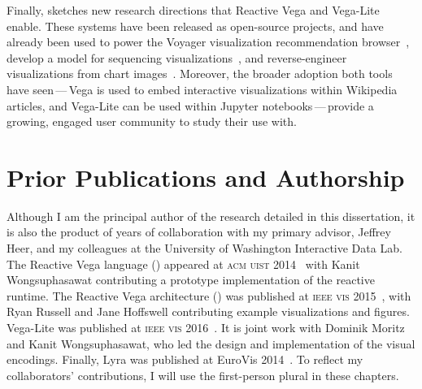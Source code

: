 Finally,  sketches new research directions that Reactive
Vega and Vega-Lite enable. These systems have been released as open-source
projects, and have already been used to power the Voyager visualization
recommendation browser~\cite{voyager,voyager2,compassql}, develop a model for
sequencing visualizations~\cite{kim:graphscape}, and reverse-engineer
visualizations from chart images~\cite{poco:reverse}. Moreover, the broader
adoption both tools have seen\,---\,Vega is used to embed interactive
visualizations within Wikipedia articles, and Vega-Lite can be used within
Jupyter notebooks\,---\,provide a growing, engaged user community to study their
use with.

\vspace{-20pt}

\section{Prior Publications and Authorship}

\vspace{-10pt}

Although I am the principal author of the research detailed in this
dissertation, it is also the product of years of collaboration with my primary
advisor, Jeffrey Heer, and my colleagues at the University of Washington
Interactive Data Lab. The Reactive Vega language () appeared
at \textsc{acm uist} 2014~\cite{satyanarayan:declarative} with Kanit
Wongsuphasawat contributing a prototype implementation of the reactive runtime.
The Reactive Vega architecture () was published at
\textsc{ieee vis} 2015~\cite{reactive-vega-arch}, with Ryan Russell and Jane
Hoffswell contributing example visualizations and figures. Vega-Lite was
published at \textsc{ieee vis} 2016~\cite{vega-lite}. It is joint work with
Dominik Moritz and Kanit Wongsuphasawat, who led the design and implementation
of the visual encodings. Finally, Lyra was published at EuroVis
2014~\cite{lyra}. To reflect my collaborators' contributions, I will use the
first-person plural in these chapters.